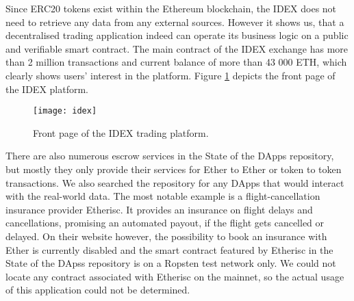 Since ERC20 tokens exist within the Ethereum blockchain, the IDEX does not need to retrieve any data from any external sources. However it shows us, that a decentralised trading application indeed can operate its business logic on a public and verifiable smart contract. The main contract of the IDEX exchange has more than 2 million transactions and current balance of more than 43 000 ETH, which clearly shows users' interest in the platform. Figure \ref{fig:idex} depicts the front page of the IDEX platform.

\begin{figure}[ht]
    \centering
    \texttt{[image: idex]}
    \caption{Front page of the IDEX trading platform.}
    \label{fig:idex}
\end{figure}

There are also numerous escrow services in the State of the DApps repository, but mostly they only provide their services for Ether to Ether or token to token transactions. We also searched the repository for any DApps that would interact with the real-world data. The most notable example is a flight-cancellation insurance provider Etherisc\footnotemark. It provides an insurance on flight delays and cancellations, promising an automated payout, if the flight gets cancelled or delayed. On their website however, the possibility to book an insurance with Ether is currently disabled and the smart contract featured by Etherisc in the State of the DApss repository is on a Ropsten test network only. We could not locate any contract associated with Etherisc on the mainnet, so the actual usage of this application could not be determined.
% 
